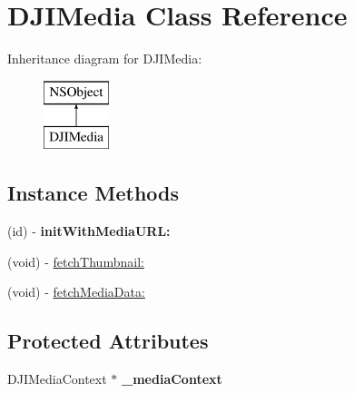 \hypertarget{interface_d_j_i_media}{\section{D\+J\+I\+Media Class Reference}
\label{interface_d_j_i_media}
}
Inheritance diagram for D\+J\+I\+Media\+:\begin{figure}[H]
\begin{center}
\leavevmode
\includegraphics[height=2.000000cm]{interface_d_j_i_media}
\end{center}
\end{figure}
\subsection*{Instance Methods}
\begin{DoxyCompactItemize}
\item 
\hypertarget{interface_d_j_i_media_af280a622a09271b06b9c095d1a8e2a63}{(id) -\/ {\bfseries init\+With\+Media\+U\+R\+L\+:}}\label{interface_d_j_i_media_af280a622a09271b06b9c095d1a8e2a63}

\item 
(void) -\/ \hyperlink{interface_d_j_i_media_a00d41d73d3223136633c46edfaa13f7c}{fetch\+Thumbnail\+:}
\item 
(void) -\/ \hyperlink{interface_d_j_i_media_a843d3c6122be27f15d3c0c8c4119962e}{fetch\+Media\+Data\+:}
\end{DoxyCompactItemize}
\subsection*{Protected Attributes}
\begin{DoxyCompactItemize}
\item 
\hypertarget{interface_d_j_i_media_ac6087ab0b801da8df2f4be91a35a2b09}{D\+J\+I\+Media\+Context $\ast$ {\bfseries \+\_\+media\+Context}}\label{interface_d_j_i_media_ac6087ab0b801da8df2f4be91a35a2b09}

\end{DoxyCompactItemize}
